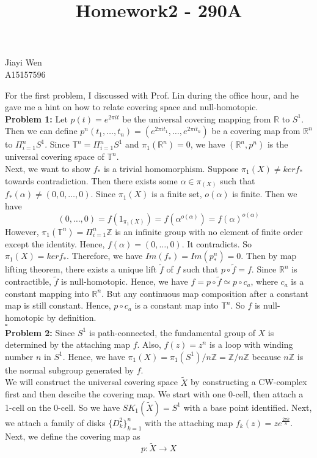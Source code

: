 \documentclass[12pt]{amsart}
\newcommand{\R}{\mathbb{R}}
\newcommand{\Z}{\mathbb{Z}}
\begin{document}
\title{Homework2 - 290A}
\maketitle
\begin{center}
    Jiayi Wen\\
    A15157596
\end{center}
For the first problem, I discussed with Prof. Lin during the office hour, and he gave me a hint on how to relate covering space and null-homotopic.\\
\textbf{Problem 1:} Let $p(t)=e^{2\pi i t}$ be the universal covering mapping from $\R$ to $S^1$. Then we can define $p^n(t_1,\dots,t_n)=(e^{2\pi i t_1},\dots,e^{2\pi i t_n})$ be a covering map from $\R^n$ to $\Pi_{i=1}^n S^1$. Since $\mathbb{T}^n=\Pi_{i=1}^n S^1$ and $\pi_1(\R^n)=0$, we have $(\R^n,p^n)$ is the universal covering space of $\mathbb{T}^n$. \\
Next, we want to show $f_\ast$ is a trivial homomorphism. Suppose $\pi_1(X)\neq ker f_\ast$ towards contradiction. Then there exists some $\alpha \in \pi_(X)$ such that $f_\ast (\alpha)\neq (0,0,\dots,0)$. Since $\pi_1(X)$ is a finite set, $o(\alpha)$ is finite. Then we have 
\[(0,\dots,0)=f(1_{\pi_1(X)})=f(\alpha^{o(\alpha)})=f(\alpha)^{o(\alpha)}\]
However, $\pi_1(\mathbb{T}^n)=\Pi_{i=1}^n\Z$ is an infinite group with no element of finite order except the identity. Hence, $f(\alpha)=(0,\dots,0)$. It contradicts. So $\pi_1(X)=ker f_\ast$. Therefore, we have $Im(f_\ast)=Im(p^n_\ast)=0$. Then by map lifting theorem, there exists a unique lift $\tilde{f}$ of $f$ such that $p\circ \tilde{f}=f$. Since $\R^n$ is contractible, $\tilde{f}$ is null-homotopic. Hence, we have $f=p\circ \tilde{f}\simeq p\circ c_a$, where $c_a$ is a constant mapping into $\R^n$. But any continuous map composition after a constant map is still constant. Hence, $p\circ c_a$ is a constant map into $\mathbb{T}^n$. So $f$ is null-homotopic by definition.
\\\phantom{qed}\hfill$\square$\\
\textbf{Problem 2:} Since $S^1$ is path-connected, the fundamental group of $X$ is determined by the attaching map $f$. Also, $f(z)=z^n$ is a loop with winding number $n$ in $S^1$. Hence, we have $\pi_1(X)=\pi_1(S^1)/n\Z=\Z/n\Z$ because $n\Z$ is the normal subgroup generated by $f$.\\
We will construct the universal covering space $\tilde{X}$ by constructing a CW-complex first and then descibe the covering map. We start with one 0-cell, then attach a 1-cell on the 0-cell. So we have $SK_1(\tilde{X})=S^1$ with a base point identified. Next, we attach a family of disks $\{D^2_k\}_{k=1}^n$ with the attaching map $f_k(z)=ze^{\frac{2\pi k}{n}}$. Next, we define the covering map as $$p:\tilde{X}\to X$$
\end{document}
